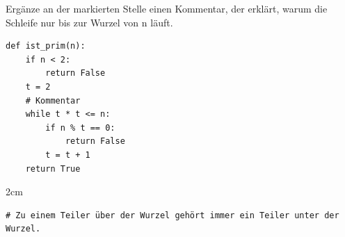 \question[2]
Ergänze an der markierten Stelle einen Kommentar, der erklärt, warum die Schleife nur bis zur Wurzel von n läuft.
\begin{lstlisting}
def ist_prim(n):
    if n < 2:
        return False
    t = 2
    # Kommentar
    while t * t <= n:
        if n % t == 0:
            return False
        t = t + 1
    return True
\end{lstlisting}
\begin{solutionbox}{2cm}
\begin{lstlisting}
# Zu einem Teiler über der Wurzel gehört immer ein Teiler unter der Wurzel.
\end{lstlisting}
\end{solutionbox}
